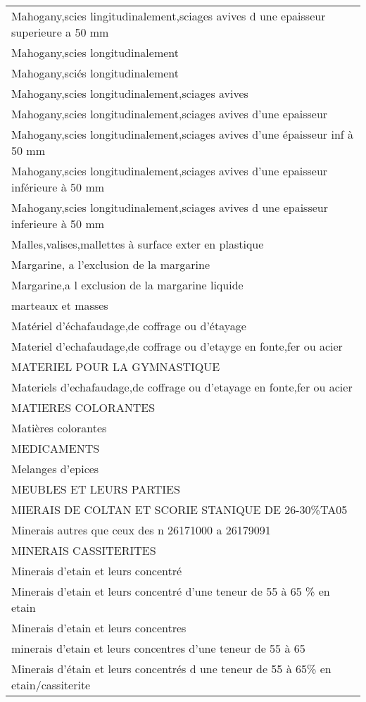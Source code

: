 \documentclass[
]{book}
\begin{document}
\begin{longtable}[t]{l}
Mahogany,scies lingitudinalement,sciages avives d une epaisseur superieure a 50 mm\\
Mahogany,scies longitudinalement\\
Mahogany,sciés longitudinalement\\
\addlinespace
Mahogany,scies longitudinalement,sciages avives\\
Mahogany,scies longitudinalement,sciages avives d'une epaisseur\\
Mahogany,scies longitudinalement,sciages avives d'une épaisseur inf à 50 mm\\
Mahogany,scies longitudinalement,sciages avives d'une epaisseur inférieure à 50 mm\\
Mahogany,scies longitudinalement,sciages avives d une epaisseur inferieure à 50 mm\\
\addlinespace
Malles,valises,mallettes à surface exter en plastique\\
Margarine, a l'exclusion de la margarine\\
Margarine,a l exclusion de la margarine liquide\\
marteaux et masses\\
Matériel d'échafaudage,de coffrage ou d'étayage\\
\addlinespace
Materiel d'echafaudage,de coffrage ou d'etayge en fonte,fer ou acier\\
MATERIEL POUR LA GYMNASTIQUE\\
Materiels d'echafaudage,de coffrage ou d'etayage en fonte,fer ou acier\\
MATIERES COLORANTES\\
Matières colorantes\\
\addlinespace
MEDICAMENTS\\
Melanges d'epices\\
MEUBLES ET LEURS PARTIES\\
MIERAIS DE COLTAN    ET SCORIE STANIQUE DE 26-30\%TA05\\
Minerais autres que ceux des n 26171000 a 26179091\\
\addlinespace
MINERAIS CASSITERITES\\
Minerais d'etain et leurs concentré\\
Minerais d'etain et leurs concentré d'une teneur de 55 à 65 \% en etain\\
Minerais d'etain et leurs concentres\\
minerais d'etain et leurs concentres d'une teneur de 55 à 65\\
\addlinespace
Minerais d'étain et leurs concentrés d une teneur de 55 à 65\% en etain/cassiterite\\

\end{longtable}
\end{document}
